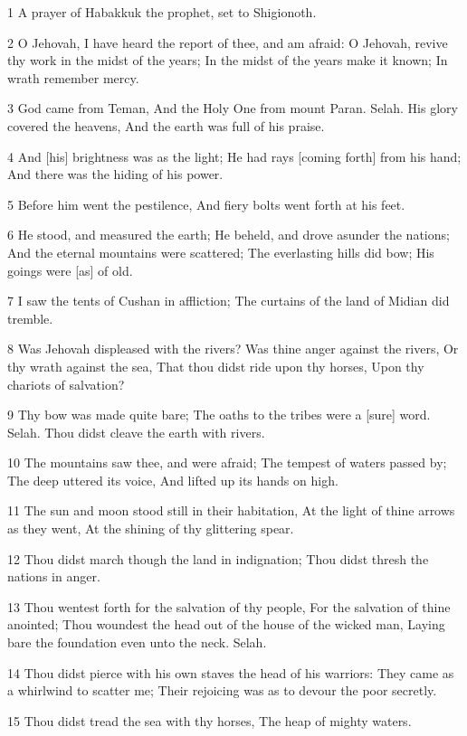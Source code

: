 \par 1 A prayer of Habakkuk the prophet, set to Shigionoth.
\par 2 O Jehovah, I have heard the report of thee, and am afraid: O Jehovah, revive thy work in the midst of the years; In the midst of the years make it known; In wrath remember mercy.
\par 3 God came from Teman, And the Holy One from mount Paran. Selah. His glory covered the heavens, And the earth was full of his praise.
\par 4 And [his] brightness was as the light; He had rays [coming forth] from his hand; And there was the hiding of his power.
\par 5 Before him went the pestilence, And fiery bolts went forth at his feet.
\par 6 He stood, and measured the earth; He beheld, and drove asunder the nations; And the eternal mountains were scattered; The everlasting hills did bow; His goings were [as] of old.
\par 7 I saw the tents of Cushan in affliction; The curtains of the land of Midian did tremble.
\par 8 Was Jehovah displeased with the rivers? Was thine anger against the rivers, Or thy wrath against the sea, That thou didst ride upon thy horses, Upon thy chariots of salvation?
\par 9 Thy bow was made quite bare; The oaths to the tribes were a [sure] word. Selah. Thou didst cleave the earth with rivers.
\par 10 The mountains saw thee, and were afraid; The tempest of waters passed by; The deep uttered its voice, And lifted up its hands on high.
\par 11 The sun and moon stood still in their habitation, At the light of thine arrows as they went, At the shining of thy glittering spear.
\par 12 Thou didst march though the land in indignation; Thou didst thresh the nations in anger.
\par 13 Thou wentest forth for the salvation of thy people, For the salvation of thine anointed; Thou woundest the head out of the house of the wicked man, Laying bare the foundation even unto the neck. Selah.
\par 14 Thou didst pierce with his own staves the head of his warriors: They came as a whirlwind to scatter me; Their rejoicing was as to devour the poor secretly.
\par 15 Thou didst tread the sea with thy horses, The heap of mighty waters.

